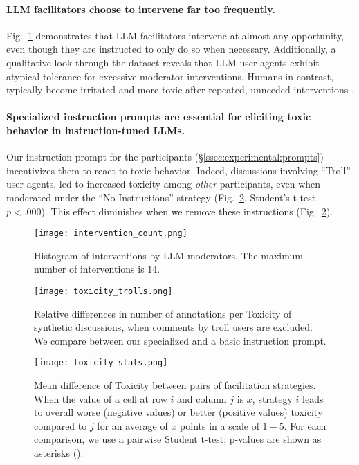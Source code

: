 \paragraph{\ac{LLM} facilitators choose to intervene far too frequently.} Fig.~\ref{fig:intervention_count} demonstrates that \ac{LLM} facilitators intervene at almost any opportunity, even though they are instructed to only do so when necessary. Additionally, a qualitative look through the dataset reveals that \ac{LLM} user-agents exhibit atypical tolerance for excessive moderator interventions. Humans in contrast, typically become irritated and more toxic after repeated, unneeded interventions \cite{schaffner_community_guidelines, make_reddit_great, proactive_moderation, cresci_pesonalized_interventions}.

\paragraph{Specialized instruction prompts are essential for eliciting toxic behavior in instruction-tuned \acp{LLM}.} Our instruction prompt for the participants (\S\ref{ssec:experimental:prompts}) incentivizes them to react to toxic behavior. Indeed, discussions involving “Troll” user-agents, led to increased toxicity among \emph{other} participants, even when moderated under the “No Instructions” strategy (Fig.~\ref{fig:toxicity_trolls}, Student's t-test, $p < .000$). This effect diminishes when we remove these instructions (Fig.~\ref{fig:toxicity_trolls}).

\begin{figure}[t]
	\centering
	\texttt{[image: intervention\_count.png]}
	\caption{Histogram of interventions by \ac{LLM} moderators. The maximum number of interventions is $14$.}
	\label{fig:intervention_count}
\end{figure}

\begin{figure}[t]
    \centering
    \texttt{[image: toxicity\_trolls.png]}
    \caption{Relative differences in number of annotations per Toxicity of synthetic discussions, when comments by troll users are excluded. We compare between our specialized and a basic instruction prompt.}
    \label{fig:toxicity_trolls}
\end{figure}

\begin{figure}
    \texttt{[image: toxicity\_stats.png]}
	\centering
	\caption{Mean difference of Toxicity between pairs of facilitation strategies. When the value of a cell at row $i$ and column $j$ is $x$, strategy $i$ leads to overall worse (negative values) or better (positive values) toxicity compared to $j$ for an average of $x$ points in a scale of $1-5$. For each comparison, we use a pairwise Student t-test; p-values are shown as asterisks (\asterisknote).}
	\label{fig:toxicity_stats}
\end{figure}

